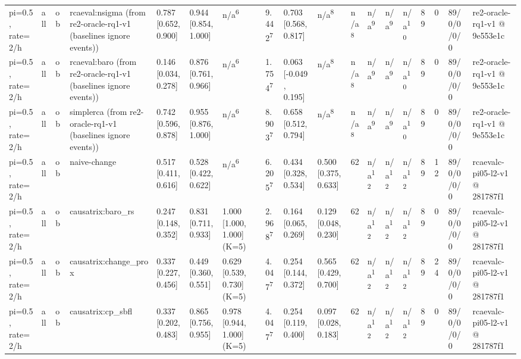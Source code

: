 \begin{table}[t]
\begin{tabular}{llllllllllllllllll}
pi=0.5, rate=2/h & all & ob & rcaeval:nsigma (from re2-oracle-rq1-v1 (baselines ignore events)) & 0.787 [0.652, 0.900] & 0.944 [0.854, 1.000] & n/a\textsuperscript{6} & 9.442\textsuperscript{7} & 0.703 [0.568, 0.817] & n/a\textsuperscript{8} & n/a\textsuperscript{8} & n/a\textsuperscript{9} & n/a\textsuperscript{9} & n/a\textsuperscript{10} & 89 & 0 & 89/0/0/0/0 & re2-oracle-rq1-v1 @ 9e553e1c \\
pi=0.5, rate=2/h & all & ob & rcaeval:baro (from re2-oracle-rq1-v1 (baselines ignore events)) & 0.146 [0.034, 0.278] & 0.876 [0.761, 0.966] & n/a\textsuperscript{6} & 1.754\textsuperscript{7} & 0.063 [-0.049, 0.195] & n/a\textsuperscript{8} & n/a\textsuperscript{8} & n/a\textsuperscript{9} & n/a\textsuperscript{9} & n/a\textsuperscript{10} & 89 & 0 & 89/0/0/0/0 & re2-oracle-rq1-v1 @ 9e553e1c \\
pi=0.5, rate=2/h & all & ob & simplerca (from re2-oracle-rq1-v1 (baselines ignore events)) & 0.742 [0.596, 0.878] & 0.955 [0.876, 1.000] & n/a\textsuperscript{6} & 8.903\textsuperscript{7} & 0.658 [0.512, 0.794] & n/a\textsuperscript{8} & n/a\textsuperscript{8} & n/a\textsuperscript{9} & n/a\textsuperscript{9} & n/a\textsuperscript{10} & 89 & 0 & 89/0/0/0/0 & re2-oracle-rq1-v1 @ 9e553e1c \\
pi=0.5, rate=2/h & all & ob & naive-change & 0.517 [0.411, 0.616] & 0.528 [0.422, 0.622] & n/a\textsuperscript{6} & 6.205\textsuperscript{7} & 0.434 [0.328, 0.534] & 0.500 [0.375, 0.633] & 62 & n/a\textsuperscript{12} & n/a\textsuperscript{12} & n/a\textsuperscript{12} & 89 & 12 & 89/0/0/0/0 & rcaevalc-pi05-l2-v1 @ 281787f1 \\
pi=0.5, rate=2/h & all & ob & causatrix:baro\_rs & 0.247 [0.148, 0.352] & 0.831 [0.711, 0.933] & 1.000 [1.000, 1.000] (K=5) & 2.968\textsuperscript{7} & 0.164 [0.065, 0.269] & 0.129 [0.048, 0.230] & 62 & n/a\textsuperscript{12} & n/a\textsuperscript{12} & n/a\textsuperscript{12} & 89 & 0 & 89/0/0/0/0 & rcaevalc-pi05-l2-v1 @ 281787f1 \\
pi=0.5, rate=2/h & all & ob & causatrix:change\_prox & 0.337 [0.227, 0.456] & 0.449 [0.360, 0.551] & 0.629 [0.539, 0.730] (K=5) & 4.047\textsuperscript{7} & 0.254 [0.144, 0.372] & 0.565 [0.429, 0.700] & 62 & n/a\textsuperscript{12} & n/a\textsuperscript{12} & n/a\textsuperscript{12} & 89 & 24 & 89/0/0/0/0 & rcaevalc-pi05-l2-v1 @ 281787f1 \\
pi=0.5, rate=2/h & all & ob & causatrix:cp\_sbfl & 0.337 [0.202, 0.483] & 0.865 [0.756, 0.955] & 0.978 [0.944, 1.000] (K=5) & 4.047\textsuperscript{7} & 0.254 [0.119, 0.400] & 0.097 [0.028, 0.183] & 62 & n/a\textsuperscript{12} & n/a\textsuperscript{12} & n/a\textsuperscript{12} & 89 & 0 & 89/0/0/0/0 & rcaevalc-pi05-l2-v1 @ 281787f1 \\

\end{tabular}
\end{table}
